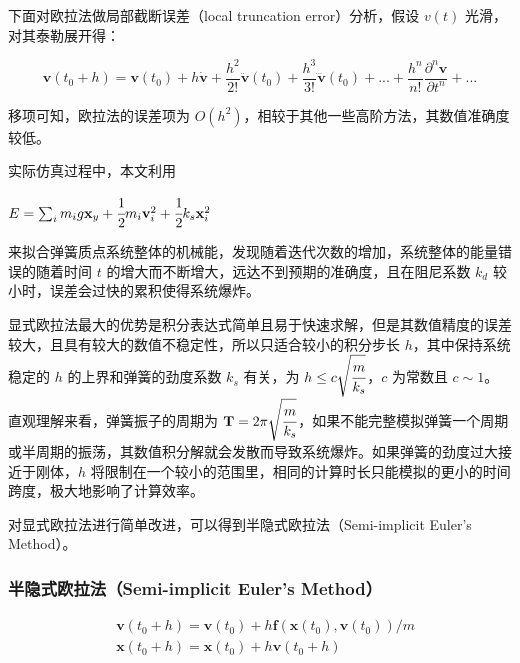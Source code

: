 \documentclass[UTF8]{ctexart}
\begin{document}
下面对欧拉法做局部截断误差（local truncation error）分析，假设 $v(t)$ 光滑，对其泰勒展开得： \par

\begin{large}
\begin{equation}
\mathbf{v}(t_0+h) = \mathbf{v}(t_0) + h \dot{\mathbf{v}} + \frac{h^2}{2!} \ddot{\mathbf{v}}(t_0) + 
\frac{h^3}{3!} \dddot{\mathbf{v}}(t_0)+...+ \frac{h^n}{n!} \frac{\partial^n \mathbf{v}}{\partial t^n} + ...
\end{equation}
\end{large}

移项可知，欧拉法的误差项为 $O(h^2)$，相较于其他一些高阶方法，其数值准确度较低。 \par

实际仿真过程中，本文利用 \begin{large} $E = \sum_{i} m_ig\mathbf{x}_y + \cfrac{1}{2} m_i \mathbf{v}_{i}^{2} + \cfrac{1}{2} k_s \mathbf{x}_{i}^{2}$ \end{large} 来拟合弹簧质点系统整体的机械能，发现随着迭代次数的增加，系统整体的能量错误的随着时间 $t$ 的增大而不断增大，远达不到预期的准确度，且在阻尼系数 $k_d$ 较小时，误差会过快的累积使得系统爆炸。

显式欧拉法最大的优势是积分表达式简单且易于快速求解，但是其数值精度的误差较大，且具有较大的数值不稳定性，所以只适合较小的积分步长 $h$，其中保持系统稳定的 $h$ 的上界和弹簧的劲度系数 $k_s$ 有关，为 $h \le c \sqrt{\cfrac{m}{k_s}}$，$c$ 为常数且 $c \sim 1$。直观理解来看，弹簧振子的周期为 $\mathbf{T} = 2 \pi \sqrt{\cfrac{m}{k_s}}$，如果不能完整模拟弹簧一个周期或半周期的振荡，其数值积分解就会发散而导致系统爆炸。如果弹簧的劲度过大接近于刚体，$h$ 将限制在一个较小的范围里，相同的计算时长只能模拟的更小的时间跨度，极大地影响了计算效率。 \par

对显式欧拉法进行简单改进，可以得到半隐式欧拉法（Semi-implicit Euler's Method）。

\subsubsection{半隐式欧拉法（Semi-implicit Euler's Method）}

\begin{large}
\begin{equation}
\begin{split}
& \mathbf{v}(t_0 + h) = \mathbf{v}(t_0) + h \mathbf{f}(\mathbf{x}(t_0), \mathbf{v}(t_0)) / m \\
& \mathbf{x}(t_0 + h) = \mathbf{x}(t_0) + h \mathbf{v} (t_0 + h)
\end{split}
\end{equation}
\end{large}
\end{document}
